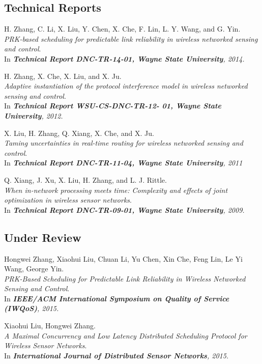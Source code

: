 \subsection{Technical Reports}
\begin{thebibliography}{4}
H. Zhang, C. Li, X. Liu, Y. Chen, X. Che, F. Lin, L. Y. Wang, and G. Yin.
\\ \newblock \emph{PRK-based scheduling for predictable link reliability in wireless networked sensing and control}.
\\ \newblock In \emph{\textbf{Technical Report DNC-TR-14-01, Wayne State University}, 2014.}

H. Zhang, X. Che, X. Liu, and X. Ju.
\\ \newblock \emph{Adaptive instantiation of the protocol interference model in wireless networked sensing and control}.
\\ \newblock In \emph{\textbf{Technical Report WSU-CS-DNC-TR-12- 01, Wayne State University}, 2012.}

X. Liu, H. Zhang, Q. Xiang, X. Che, and X. Ju.
\\ \newblock \emph{Taming uncertainties in real-time routing for wireless networked sensing and control}.
\\ \newblock In \emph{\textbf{Technical Report DNC-TR-11-04, Wayne State University}, 2011}

Q. Xiang, J. Xu, X. Liu, H. Zhang, and L. J. Rittle.
\\ \newblock \emph{When in-network processing meets time: Complexity and effects of joint optimization in wireless sensor networks}.
\\ \newblock In \emph{\textbf{Technical Report DNC-TR-09-01, Wayne State University}, 2009.}
\end{thebibliography}

\subsection{Under Review}
\begin{thebibliography}{2}
Hongwei Zhang, Xiaohui Liu, Chuan Li, Yu Chen, Xin Che, Feng Lin, Le Yi Wang, George Yin.
\\ \newblock \emph{PRK-Based Scheduling for Predictable Link Reliability in Wireless Networked Sensing and Control}.
\\ \newblock In \emph{\textbf{IEEE/ACM International Symposium on Quality of Service (IWQoS)}, 2015.}

Xiaohui Liu, Hongwei Zhang.
\\ \newblock \emph{A Maximal Concurrency and Low Latency Distributed Scheduling Protocol for Wireless Sensor Networks}.
\\ \newblock In \emph{\textbf{International Journal of Distributed Sensor Networks}, 2015.}
\end{thebibliography}

